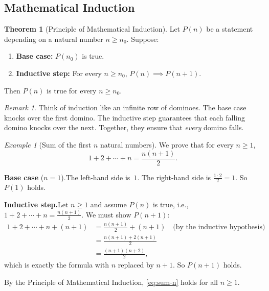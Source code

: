 \documentclass[12pt,a4paper,openany]{book}
\theoremstyle{definition}
\newtheorem{theorem}{Theorem}[chapter]
\theoremstyle{remark}
\newtheorem{remark}{Remark}[chapter]
\newtheorem{example}{Example}[chapter]
\begin{document}
\subsection{Mathematical Induction}
\label{subsec:induction}

\begin{theorem}[Principle of Mathematical Induction]\label{thm:induction}
Let $P(n)$ be a statement depending on a natural number $n \geq n_0$.
Suppose:
\begin{enumerate}[label=(\roman*)]
  \item \textbf{Base case:} $P(n_0)$ is true.
  \item \textbf{Inductive step:} For every
    $n \geq n_0$, $P(n) \implies P(n+1)$.
\end{enumerate}
Then $P(n)$ is true for every $n \geq n_0$.
\end{theorem}

\begin{remark}
Think of induction like an infinite row of dominoes.  The base case knocks
over the first domino.  The inductive step guarantees that each falling
domino knocks over the next.  Together, they ensure that \emph{every} domino
falls.
\end{remark}

\begin{example}[Sum of the first $n$ natural numbers]\label{ex:induction-sum}
We prove that for every $n \geq 1$,
\begin{equation}\label{eq:sum-n}
  1 + 2 + \cdots + n = \frac{n(n+1)}{2}.
\end{equation}

\textbf{Base case} ($n=1$).\quad The left-hand side is~$1$.  The right-hand
side is $\frac{1 \cdot 2}{2} = 1$.  So $P(1)$ holds.

\textbf{Inductive step.}\quad Let $n \geq 1$ and assume $P(n)$ is true,
i.e., $1 + 2 + \cdots + n = \frac{n(n+1)}{2}$.  We must show $P(n+1)$:
\begin{align*}
  1 + 2 + \cdots + n + (n+1)
    &= \frac{n(n+1)}{2} + (n+1)
       \quad\text{(by the inductive hypothesis)} \\
    &= \frac{n(n+1) + 2(n+1)}{2} \\
    &= \frac{(n+1)(n+2)}{2},
\end{align*}
which is exactly the formula with $n$ replaced by $n+1$.  So $P(n+1)$ holds.

By the Principle of Mathematical Induction, \eqref{eq:sum-n} holds for all
$n \geq 1$.
\end{example}
\end{document}
